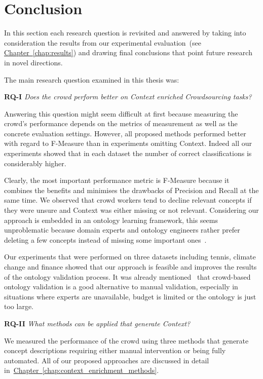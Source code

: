 
\section{Conclusion}\label{sec:conclusion}
In this section each research question is revisited and answered by taking into consideration the results from our experimental evaluation~(see \hyperref[chap:results]{Chapter~\ref*{chap:results}}) and drawing final conclusions that point future research in novel directions. 

The main research question examined in this thesis was:
 
\textbf{RQ-I} \emph{Does the crowd perform better on Context enriched Crowdsourcing tasks?}

Answering this question might seem difficult at first because measuring the crowd's performance depends on the metrics of measurement as well as the concrete evaluation settings. However, all proposed methods performed better with regard to F-Measure than in experiments omitting Context. Indeed all our experiments showed that in each dataset the number of correct classifications is considerably higher. 

Clearly, the most important performance metric is F-Measure because it combines the benefits and minimises the drawbacks of Precision and Recall at the same time. We observed that crowd workers tend to decline relevant concepts if they were unsure and Context was either missing or not relevant. Considering our approach is embedded in an ontology learning framework, this seems unproblematic because domain experts and ontology engineers rather prefer deleting a few concepts instead of missing some important ones~\cite{sabou2006}. 

Our experiments that were performed on three datasets including tennis, climate change and finance showed that our approach is feasible and improves the results of the ontology validation process. It was already mentioned~\cite{mortensen2015, mortensen2016, wohlgenannt2016} that crowd-based ontology validation is a good alternative to manual validation, especially in situations where experts are unavailable, budget is limited or the ontology is just too large. 

\textbf{RQ-II} \emph{What methods can be applied that generate Context?}

We measured the performance of the crowd using three methods that generate concept descriptions requiring either manual intervention or being fully automated. All of our proposed approaches are discussed in detail in~\hyperref[chap:context_enrichment_methods]{Chapter~\ref*{chap:context_enrichment_methods}}. 

